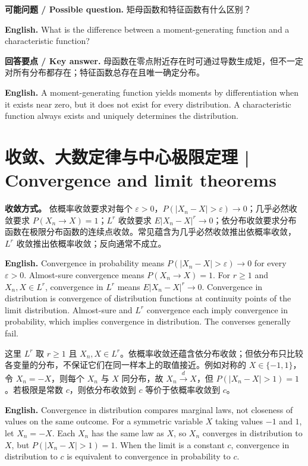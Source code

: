 \documentclass[UTF8,11pt,a4paper]{ctexart}
\newcommand{\EN}[1]{\par\noindent\textbf{English.} #1\par}
\newcommand{\ASK}[4]{\par\noindent\textbf{可能问题 / Possible question.} #1\par\EN{#2}\noindent\textbf{回答要点 / Key answer.} #3\par\EN{#4}\medskip}
\begin{document}
\ASK{矩母函数和特征函数有什么区别？}{What is the difference between a moment-generating function and a characteristic function?}{母函数在零点附近存在时可通过导数生成矩，但不一定对所有分布都存在；特征函数总存在且唯一确定分布。}{A moment-generating function yields moments by differentiation when it exists near zero, but it does not exist for every distribution. A characteristic function always exists and uniquely determines the distribution.}

\section{收敛、大数定律与中心极限定理 | Convergence and limit theorems}
\noindent\textbf{收敛方式。} 依概率收敛要求对每个 $\varepsilon>0$，$P(|X_n-X|>\varepsilon)\to0$；几乎必然收敛要求 $P(X_n\to X)=1$；$L^r$ 收敛要求 $E|X_n-X|^r\to0$；依分布收敛要求分布函数在极限分布函数的连续点收敛。常见蕴含为几乎必然收敛推出依概率收敛，$L^r$ 收敛推出依概率收敛；反向通常不成立。

\EN{Convergence in probability means $P(|X_n-X|>\varepsilon)\to0$ for every $\varepsilon>0$. Almost-sure convergence means $P(X_n\to X)=1$. For $r\ge1$ and $X_n,X\in L^r$, convergence in $L^r$ means $E|X_n-X|^r\to0$. Convergence in distribution is convergence of distribution functions at continuity points of the limit distribution. Almost-sure and $L^r$ convergence each imply convergence in probability, which implies convergence in distribution. The converses generally fail.}

\noindent 这里 $L^r$ 取 $r\ge1$ 且 $X_n,X\in L^r$。依概率收敛还蕴含依分布收敛；但依分布只比较各变量的分布，不保证它们在同一样本上的取值接近。例如对称的 $X\in\{-1,1\}$，令 $X_n=-X$，则每个 $X_n$ 与 $X$ 同分布，故 $X_n\xrightarrow{d}X$，但 $P(|X_n-X|>1)=1$。若极限是常数 $c$，则依分布收敛到 $c$ 等价于依概率收敛到 $c$。
\EN{Convergence in distribution compares marginal laws, not closeness of values on the same outcome. For a symmetric variable $X$ taking values $-1$ and $1$, let $X_n=-X$. Each $X_n$ has the same law as $X$, so $X_n$ converges in distribution to $X$, but $P(|X_n-X|>1)=1$. When the limit is a constant $c$, convergence in distribution to $c$ is equivalent to convergence in probability to $c$.}
\end{document}
